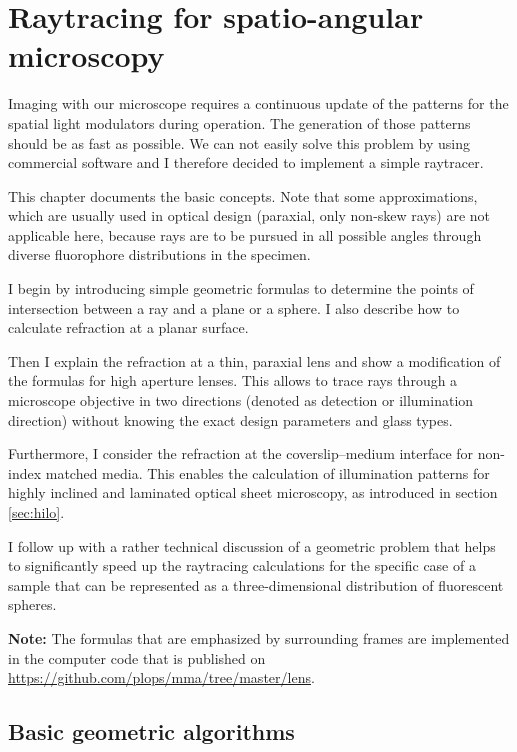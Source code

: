 \chapter{Raytracing for spatio-angular microscopy}
\label{sec:raytrace}
\renewcommand{\i}{\nvect i}
\begin{summary}
  Imaging with our microscope requires a continuous update of the
  patterns for the spatial light modulators during operation. The
  generation of those patterns should be as fast as possible. We can
  not easily solve this problem by using commercial software and I
  therefore decided to implement a simple raytracer.

  This chapter documents the basic concepts. Note that some
  approximations, which are usually used in optical design (paraxial,
  only non-skew rays) are not applicable here, because rays are to be
  pursued in all possible angles through diverse fluorophore
  distributions in the specimen.

  I begin by introducing simple geometric formulas to determine the
  points of intersection between a ray and a plane or a sphere. I also
  describe how to calculate refraction at a planar surface.

  Then I explain the refraction at a thin, paraxial lens and show a
  modification of the formulas for high aperture lenses. This allows
  to trace rays through a microscope objective in two directions
  (denoted as detection or illumination direction) without knowing the
  exact design parameters and glass types.

  Furthermore, I consider the refraction at the coverslip--medium
  interface for non-index matched media. This enables the calculation
  of illumination patterns for highly inclined and laminated optical
  sheet microscopy, as introduced in section \ref{sec:hilo}.

  I follow up with a rather technical discussion of a geometric
  problem that helps to significantly speed up the raytracing
  calculations for the specific case of a sample that can be
  represented as a three-dimensional distribution of fluorescent
  spheres.

  {\bf Note:} The formulas that are emphasized by surrounding frames
  are implemented in the computer code that is published on
  \url{https://github.com/plops/mma/tree/master/lens}.
\end{summary}
\section{Basic geometric algorithms}
